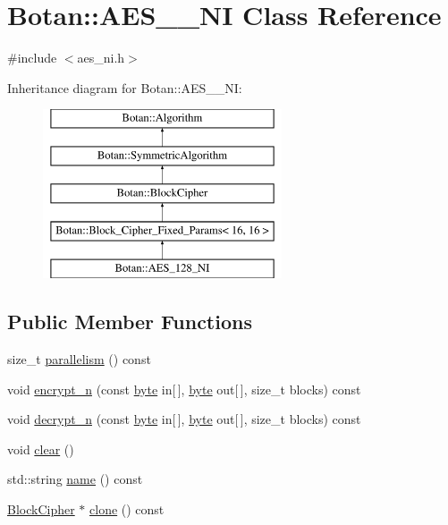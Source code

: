 \hypertarget{classBotan_1_1AES__128__NI}{\section{Botan\-:\-:A\-E\-S\-\_\-\_\-\-N\-I Class Reference}
\label{classBotan_1_1AES__128__NI}
}


{\ttfamily \#include $<$aes\-\_\-ni.\-h$>$}

Inheritance diagram for Botan\-:\-:A\-E\-S\-\_\-\_\-\-N\-I\-:\begin{figure}[H]
\begin{center}
\leavevmode
\includegraphics[height=5.000000cm]{classBotan_1_1AES__128__NI}
\end{center}
\end{figure}
\subsection*{Public Member Functions}
\begin{DoxyCompactItemize}
\item 
size\-\_\-t \hyperlink{classBotan_1_1AES__128__NI_adfc8b702ee1865e4363d29cea8867c48}{parallelism} () const 
\item 
void \hyperlink{classBotan_1_1AES__128__NI_ab628466159fa2c75c264358a1b7f0c15}{encrypt\-\_\-n} (const \hyperlink{namespaceBotan_a7d793989d801281df48c6b19616b8b84}{byte} in\mbox{[}$\,$\mbox{]}, \hyperlink{namespaceBotan_a7d793989d801281df48c6b19616b8b84}{byte} out\mbox{[}$\,$\mbox{]}, size\-\_\-t blocks) const 
\item 
void \hyperlink{classBotan_1_1AES__128__NI_afbcfcd47db6d827150f2a073e4232cae}{decrypt\-\_\-n} (const \hyperlink{namespaceBotan_a7d793989d801281df48c6b19616b8b84}{byte} in\mbox{[}$\,$\mbox{]}, \hyperlink{namespaceBotan_a7d793989d801281df48c6b19616b8b84}{byte} out\mbox{[}$\,$\mbox{]}, size\-\_\-t blocks) const 
\item 
void \hyperlink{classBotan_1_1AES__128__NI_a794e79a1e8e70bb87a5709a6d7349ab5}{clear} ()
\item 
std\-::string \hyperlink{classBotan_1_1AES__128__NI_ac3433c5e427fb9a39a8143c22e73661f}{name} () const 
\item 
\hyperlink{classBotan_1_1BlockCipher}{Block\-Cipher} $\ast$ \hyperlink{classBotan_1_1AES__128__NI_a7909ffbe38ca11975550ff2ddd90864b}{clone} () const 
\end{DoxyCompactItemize}
